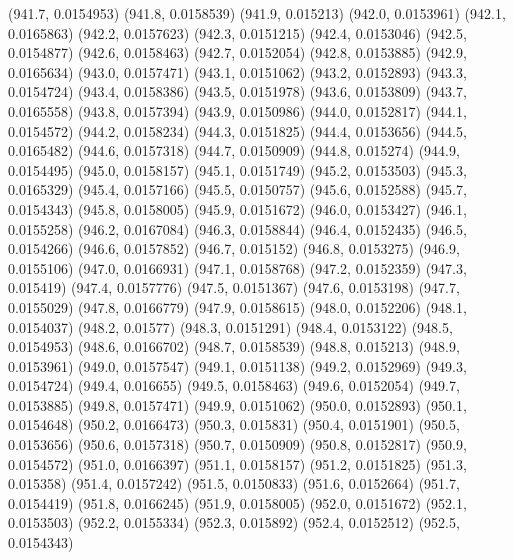 {					(941.7, 0.0154953)
					(941.8, 0.0158539)
					(941.9, 0.015213)
					(942.0, 0.0153961)
					(942.1, 0.0165863)
					(942.2, 0.0157623)
					(942.3, 0.0151215)
					(942.4, 0.0153046)
					(942.5, 0.0154877)
					(942.6, 0.0158463)
					(942.7, 0.0152054)
					(942.8, 0.0153885)
					(942.9, 0.0165634)
					(943.0, 0.0157471)
					(943.1, 0.0151062)
					(943.2, 0.0152893)
					(943.3, 0.0154724)
					(943.4, 0.0158386)
					(943.5, 0.0151978)
					(943.6, 0.0153809)
					(943.7, 0.0165558)
					(943.8, 0.0157394)
					(943.9, 0.0150986)
					(944.0, 0.0152817)
					(944.1, 0.0154572)
					(944.2, 0.0158234)
					(944.3, 0.0151825)
					(944.4, 0.0153656)
					(944.5, 0.0165482)
					(944.6, 0.0157318)
					(944.7, 0.0150909)
					(944.8, 0.015274)
					(944.9, 0.0154495)
					(945.0, 0.0158157)
					(945.1, 0.0151749)
					(945.2, 0.0153503)
					(945.3, 0.0165329)
					(945.4, 0.0157166)
					(945.5, 0.0150757)
					(945.6, 0.0152588)
					(945.7, 0.0154343)
					(945.8, 0.0158005)
					(945.9, 0.0151672)
					(946.0, 0.0153427)
					(946.1, 0.0155258)
					(946.2, 0.0167084)
					(946.3, 0.0158844)
					(946.4, 0.0152435)
					(946.5, 0.0154266)
					(946.6, 0.0157852)
					(946.7, 0.015152)
					(946.8, 0.0153275)
					(946.9, 0.0155106)
					(947.0, 0.0166931)
					(947.1, 0.0158768)
					(947.2, 0.0152359)
					(947.3, 0.015419)
					(947.4, 0.0157776)
					(947.5, 0.0151367)
					(947.6, 0.0153198)
					(947.7, 0.0155029)
					(947.8, 0.0166779)
					(947.9, 0.0158615)
					(948.0, 0.0152206)
					(948.1, 0.0154037)
					(948.2, 0.01577)
					(948.3, 0.0151291)
					(948.4, 0.0153122)
					(948.5, 0.0154953)
					(948.6, 0.0166702)
					(948.7, 0.0158539)
					(948.8, 0.015213)
					(948.9, 0.0153961)
					(949.0, 0.0157547)
					(949.1, 0.0151138)
					(949.2, 0.0152969)
					(949.3, 0.0154724)
					(949.4, 0.016655)
					(949.5, 0.0158463)
					(949.6, 0.0152054)
					(949.7, 0.0153885)
					(949.8, 0.0157471)
					(949.9, 0.0151062)
					(950.0, 0.0152893)
					(950.1, 0.0154648)
					(950.2, 0.0166473)
					(950.3, 0.015831)
					(950.4, 0.0151901)
					(950.5, 0.0153656)
					(950.6, 0.0157318)
					(950.7, 0.0150909)
					(950.8, 0.0152817)
					(950.9, 0.0154572)
					(951.0, 0.0166397)
					(951.1, 0.0158157)
					(951.2, 0.0151825)
					(951.3, 0.015358)
					(951.4, 0.0157242)
					(951.5, 0.0150833)
					(951.6, 0.0152664)
					(951.7, 0.0154419)
					(951.8, 0.0166245)
					(951.9, 0.0158005)
					(952.0, 0.0151672)
					(952.1, 0.0153503)
					(952.2, 0.0155334)
					(952.3, 0.015892)
					(952.4, 0.0152512)
					(952.5, 0.0154343)
}
